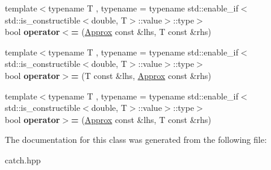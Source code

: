 \begin{DoxyCompactItemize}
\item 
{\footnotesize template$<$typename T , typename  = typename std\+::enable\+\_\+if$<$std\+::is\+\_\+constructible$<$double, T$>$\+::value$>$\+::type$>$ }\\bool {\bfseries operator$<$=} (\hyperlink{classCatch_1_1Detail_1_1Approx}{Approx} const \&lhs, T const \&rhs)\hypertarget{classCatch_1_1Detail_1_1Approx_a6040b908588745570847d7ae8483b091}{}\label{classCatch_1_1Detail_1_1Approx_a6040b908588745570847d7ae8483b091}

\item 
{\footnotesize template$<$typename T , typename  = typename std\+::enable\+\_\+if$<$std\+::is\+\_\+constructible$<$double, T$>$\+::value$>$\+::type$>$ }\\bool {\bfseries operator$>$=} (T const \&lhs, \hyperlink{classCatch_1_1Detail_1_1Approx}{Approx} const \&rhs)\hypertarget{classCatch_1_1Detail_1_1Approx_affd27efc62be386daeecb7a09e828d44}{}\label{classCatch_1_1Detail_1_1Approx_affd27efc62be386daeecb7a09e828d44}

\item 
{\footnotesize template$<$typename T , typename  = typename std\+::enable\+\_\+if$<$std\+::is\+\_\+constructible$<$double, T$>$\+::value$>$\+::type$>$ }\\bool {\bfseries operator$>$=} (\hyperlink{classCatch_1_1Detail_1_1Approx}{Approx} const \&lhs, T const \&rhs)\hypertarget{classCatch_1_1Detail_1_1Approx_a5899b8a36725406701e2ebded2971ee6}{}\label{classCatch_1_1Detail_1_1Approx_a5899b8a36725406701e2ebded2971ee6}

\end{DoxyCompactItemize}


The documentation for this class was generated from the following file\+:\begin{DoxyCompactItemize}
\item 
catch.\+hpp\end{DoxyCompactItemize}

